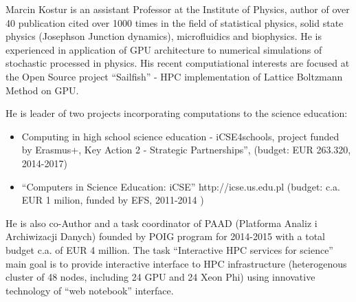 \begin{participant}[type=leadPI,PM=12,salary=2000,gender=male]{Marcin Kostur}
is an assistant Professor at the Institute of Physics, author of  over 40
publication cited over 1000 times in the field of statistical physics,
solid state physics (Josephson Junction dynamics), microfluidics and
biophysics. He is experienced in application of GPU architecture to
numerical simulations of stochastic processed in physics. His recent
computiational interests are focused at the Open Source project
``Sailfish'' - HPC implementation of Lattice Boltzmann Method on GPU.

He is leader of two projects incorporating computations to the science education:

\begin{itemize}
\item Computing in high school science education - iCSE4schools,
  project funded by Erasmus+, Key Action 2 - Strategic Partnerships'',
  (budget: EUR 263.320, 2014-2017)
\item ``Computers in Science Education: iCSE'' http://icse.us.edu.pl
  (budget: c.a. EUR 1 milion, funded by EFS, 2011-2014 )
\end{itemize}

He is also co-Author and a task coordinator of PAAD (Platforma Analiz i
Archiwizacji Danych) founded by POIG program for 2014-2015 with a total budget
c.a. of EUR 4 million. The task ``Interactive HPC services for science''
main goal is to provide interactive interface to HPC infrastructure
(heterogenous cluster of 48 nodes, including 24 GPU and 24 Xeon Phi)
using innovative technology of ``web notebook'' interface.  




\end{participant}
